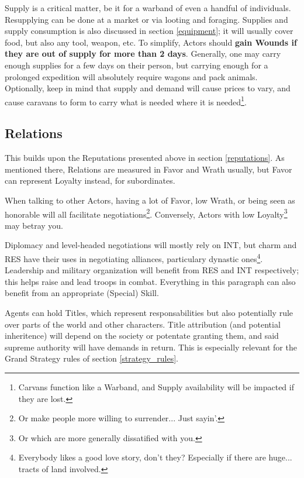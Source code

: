 Supply is a critical matter, be it for a warband of even a handful of individuals. Resupplying can be done at a market or via looting and foraging. Supplies and supply consumption is also discussed in section \ref{equipment}; it will usually cover food, but also any tool, weapon, etc. To simplify, Actors should \textbf{gain Wounds if they are out of supply for more than 2 days}. Generally, one may carry enough supplies for a few days on their person, but carrying enough for a prolonged expedition will absolutely require wagons and pack animals. Optionally, keep in mind that supply and demand will cause prices to vary, and cause caravans to form to carry what is needed where it is needed\footnote{Carvans function like a Warband, and Supply availability will be impacted if they are lost.}.
	

\subsection{Relations}

\label{relations}

This builds upon the Reputations presented above in section \ref{reputations}. As mentioned there, Relations are measured in Favor and Wrath usually, but Favor can represent Loyalty instead, for subordinates.

When talking to other Actors, having a lot of Favor, low Wrath, or being seen as honorable will all facilitate negotiations\footnote{Or make people more willing to surrender... Just sayin'.}. Conversely, Actors with low Loyalty\footnote{Or which are more generally dissatified with you.} may betray you.

Diplomacy and level-headed negotiations will mostly rely on INT, but charm and RES have their uses in negotiating alliances, particulary dynastic ones\footnote{Everybody likes a good love story, don't they? Especially if there are huge... tracts of land involved.}. Leadership and military organization will benefit from RES and INT respectively; this helps raise and lead troops in combat. Everything in this paragraph can also benefit from an appropriate (Special) Skill.

Agents can hold Titles, which represent responsabilities but also potentially rule over parts of the world and other characters. Title attribution (and potential inheritence) will depend on the society or potentate granting them, and said supreme authority will have demands in return. This is especially relevant for the Grand Strategy rules of section \ref{strategy_rules}.



